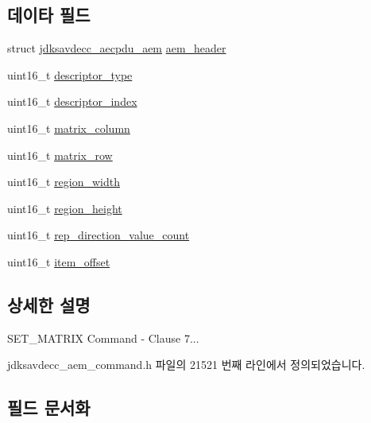 \subsection*{데이타 필드}
\begin{DoxyCompactItemize}
\item 
struct \hyperlink{structjdksavdecc__aecpdu__aem}{jdksavdecc\+\_\+aecpdu\+\_\+aem} \hyperlink{structjdksavdecc__aem__command__set__matrix_ae1e77ccb75ff5021ad923221eab38294}{aem\+\_\+header}
\item 
uint16\+\_\+t \hyperlink{structjdksavdecc__aem__command__set__matrix_ab7c32b6c7131c13d4ea3b7ee2f09b78d}{descriptor\+\_\+type}
\item 
uint16\+\_\+t \hyperlink{structjdksavdecc__aem__command__set__matrix_a042bbc76d835b82d27c1932431ee38d4}{descriptor\+\_\+index}
\item 
uint16\+\_\+t \hyperlink{structjdksavdecc__aem__command__set__matrix_aa7db0d3d8cd5b895d1f9bf81b816fd66}{matrix\+\_\+column}
\item 
uint16\+\_\+t \hyperlink{structjdksavdecc__aem__command__set__matrix_a8cb269dcca919ec8232ec33a09477c07}{matrix\+\_\+row}
\item 
uint16\+\_\+t \hyperlink{structjdksavdecc__aem__command__set__matrix_a87453b735ebc871f58f507139df28b89}{region\+\_\+width}
\item 
uint16\+\_\+t \hyperlink{structjdksavdecc__aem__command__set__matrix_afac2ca21b44ee4f90b555f2609321c60}{region\+\_\+height}
\item 
uint16\+\_\+t \hyperlink{structjdksavdecc__aem__command__set__matrix_ad43e01e546f8431400084a400bc17c47}{rep\+\_\+direction\+\_\+value\+\_\+count}
\item 
uint16\+\_\+t \hyperlink{structjdksavdecc__aem__command__set__matrix_afbb15486d86fc9c3680a6864ddbc029b}{item\+\_\+offset}
\end{DoxyCompactItemize}


\subsection{상세한 설명}
S\+E\+T\+\_\+\+M\+A\+T\+R\+IX Command -\/ Clause 7... 

jdksavdecc\+\_\+aem\+\_\+command.\+h 파일의 21521 번째 라인에서 정의되었습니다.



\subsection{필드 문서화}
